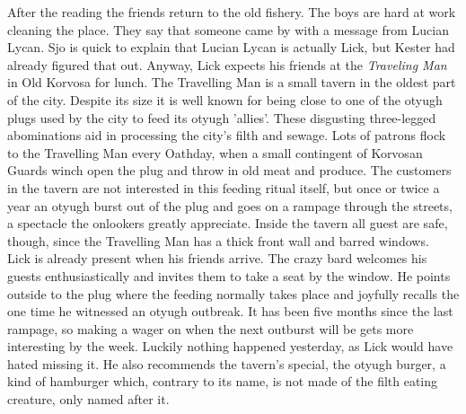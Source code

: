 After the reading the friends return to the old fishery. The boys are hard at work cleaning the place. They say that someone came by with a message from Lucian Lycan. Sjo is quick to explain that Lucian Lycan is actually Lick, but Kester had already figured that out. Anyway, Lick expects his friends at the {\itshape Traveling Man} in Old Korvosa for lunch. The Travelling Man is a small tavern in the oldest part of the city. Despite its size it is well known for being close to one of the otyugh plugs used by the city to feed its otyugh 'allies'. These disgusting three-legged abominations aid in processing the city's filth and sewage. Lots of patrons flock to the Travelling Man every Oathday, when a small contingent of Korvosan Guards winch open the plug and throw in old meat and produce. The customers in the tavern are not interested in this feeding ritual itself, but once or twice a year an otyugh burst out of the plug and goes on a rampage through the streets, a spectacle the onlookers greatly appreciate. Inside the tavern all guest are safe, though, since the Travelling Man has a thick front wall and barred windows.\\

Lick is already present when his friends arrive. The crazy bard welcomes his guests enthusiastically and invites them to take a seat by the window. He points outside to the plug where the feeding normally takes place and joyfully recalls the one time he witnessed an otyugh outbreak. It has been five months since the last rampage, so making a wager on when the next outburst will be gets more interesting by the week. Luckily nothing happened yesterday, as Lick would have hated missing it. He also recommends the tavern's special, the otyugh burger, a kind of hamburger which, contrary to its name, is not made of the filth eating creature, only named after it.\\

